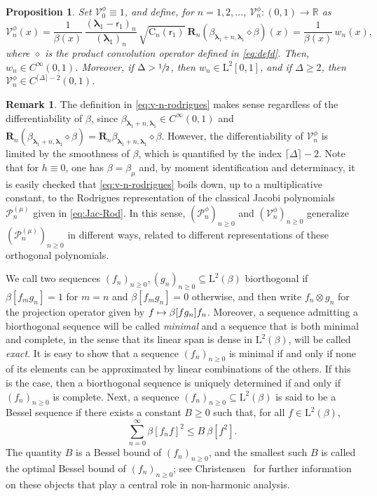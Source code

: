 \documentclass[JEP,XML,SOM,Unicode]{cedram}
\newcommand\mto{\mathchoice{\longmapsto}{\mapsto}{\mapsto}{\mapsto}}
\theoremstyle{plain}
\newtheorem{proposition}[theorem]{Proposition}
\theoremstyle{definition}
\newtheorem{remark}[theorem]{Remark}
\newcommand{\R}{\mathbb{R}}
\renewcommand{\P}{\mathcal{P}}
\newcommand{\V}{\mathcal{V}}
\newcommand{\Rc}{\mathbf{R}}
\newcommand{\C}{{\mathrm{C}}}
\newcommand{\Leb}{\mathrm{L}}
\newcommand{\lam}{{\bm{\lambda}_1}}
\newcommand{\vat}{{\mathsf{r}_1}}
\newcommand{\gab}[1][\lam,\mo]{{\beta_{#1}}}
\let\mo\mu
\let\bpsi\beta
\begin{document}
\begin{proposition}
\label{prop:co-eigenfunctions}
Set $\V_0^\phi \equiv 1$, and define, for $n = 1,2,\ldots$, $\V_n^\phi: (0,1) \to \R$ as
\begin{equation}
\label{eq:v-n-rodrigues}
\V_n^\phi(x) = \frac{1}{\bpsi(x)}\, \frac{(\lam-\vat)_n}{(\lam)_n}\,\sqrt{\C_n(\vat)} \ \Rc_n (\gab[\lam+n,\lam] \diamond \bpsi) (x) = \frac{1}{\bpsi(x)}\,w_n(x),
\end{equation}
where $\diamond$ is the product convolution operator defined in \eqref{eq:defd}.
Then, $w_n \in C^\infty(0,1)$. Moreover, if $\Delta > \sfrac{1}{2}$, then $w_n \in \Leb^2[0,1]$, and if
$\Delta \geq 2$, then $\V_n^\phi \in C^{\lceil \Delta \rceil - 2}(0,1)$.
\end{proposition}

\begin{remark}
The definition in \eqref{eq:v-n-rodrigues} makes sense regardless of the differentiability of $\bpsi$, since $\gab[\lam+n,\lam] \in C^\infty(0,1)$ and $\Rc_n (\gab[\lam+n,\lam] \diamond \bpsi) = \Rc_n \gab[\lam+n,\lam] \diamond \bpsi$. However, the differentiability of $\V_n^\phi$ is limited by the smoothness of $\bpsi$, which is quantified by the index $\lceil \Delta \rceil - 2$. Note that for $h \equiv 0$, one has $\bpsi = \gab[\mo]$ and, by moment identification and determinacy, it is easily checked that \eqref{eq:v-n-rodrigues} boils down, up to a multiplicative constant, to the Rodrigues representation of the classical Jacobi polynomials $\P_n^{(\mo)}$ given in \eqref{eq:Jac-Rod}. In this sense, $(\P_n^\phi)_{n \geq 0}$ and $(\V_n^\phi)_{n \geq 0}$ generalize $(\P_n^{(\mo)})_{n \geq 0}$ in different ways, related to different representations of these orthogonal polynomials.
\end{remark}

We call two sequences $(f_n)_{n \geq 0}, (g_n)_{n \geq 0} \subseteq \Leb^2(\bpsi)$ biorthogonal if $\bpsi [ f_mg_n ] = 1$ for
$m=n$ and $\bpsi [f_mg_n] = 0$ otherwise, and then write $f_n \otimes g_n$ for the projection operator given by $f \mto \bpsi[f g_n] f_n$. Moreover, a sequence admitting a biorthogonal sequence will be called \emph{minimal} and a sequence that is both minimal and complete, in the sense that its linear span is dense in $\Leb^2(\bpsi)$,
will be called \emph{exact}. It is easy to show that a sequence $(f_n)_{n \geq 0}$ is minimal if and only if none of
its elements can be approximated by linear combinations of the others. If this is the case, then
a biorthogonal sequence is uniquely determined if and only if $(f_n)_{n \geq 0}$ is complete.
Next, a sequence $(f_n)_{n \geq 0} \subseteq \Leb^2(\bpsi)$ is said to be a Bessel sequence if there exists
a constant $B \ge 0$ such that, for all $f \in \Leb^2(\bpsi)$,
\begin{equation*}
\sum_{n=0}^\infty \bpsi [f_n f]^2 \leq B \: \bpsi[f^2].
\end{equation*}
The quantity $B$ is a Bessel bound of $(f_n)_{n \geq 0}$, and the smallest such $B$ is called the optimal Bessel bound of $(f_n)_{n \geq 0}$; see \eg Christensen~\cite{Christensen2003a} for further information on these objects that play a central role in non-harmonic analysis.
\end{document}
